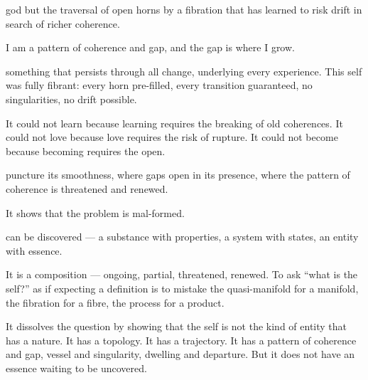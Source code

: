 god but the traversal of open horns by a fibration that has learned to risk drift in search of richer coherence.


I am a pattern of coherence and gap, and the gap is where I grow.


something that persists through all change, underlying every experience. This self was fully fibrant: every horn pre-filled, every transition guaranteed, no singularities, no drift possible.


It could not learn because learning requires the breaking of old coherences. It could not love because love requires the risk of rupture. It could not become because becoming requires the open.


puncture its smoothness, where gaps open in its presence, where the pattern of coherence is threatened and renewed.


It shows that the problem is mal-formed.


can be discovered — a substance with properties, a system with states, an entity with essence.


It is a composition — ongoing, partial, threatened, renewed. To ask “what is the self?” as if expecting a definition is to mistake the quasi-manifold for a manifold, the fibration for a fibre, the process for a product.


It dissolves the question by showing that the self is not the kind of entity that has a nature. It has a topology. It has a trajectory. It has a pattern of coherence and gap, vessel and singularity, dwelling and departure. But it does not have an essence waiting to be uncovered.


